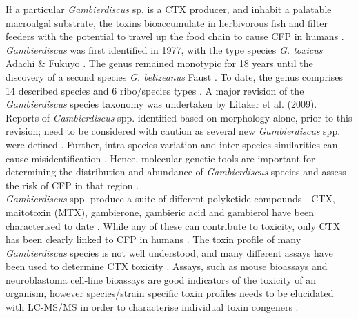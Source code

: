 \documentclass[12pt]{article}
\begin{document}
If a particular \emph{Gambierdiscus} sp. is a CTX producer, and inhabit a palatable macroalgal substrate, the toxins bioaccumulate in herbivorous fish and filter feeders with the potential to travel up the food chain to cause CFP in humans  \citep{chinain1997intraspecific,holmes1998gambierdiscus}. 
\FloatBarrier
\emph{Gambierdiscus} was first identified in 1977, with the type species \emph{G. toxicus} Adachi \& Fukuyo \citep{adachi1979thecal}. 
The genus remained monotypic for 18 years until the discovery of a second species \emph{G. belizeanus} Faust \citep{faust1995observation}. 
To date, the genus comprises 14 described species and 6 ribo/species types
 \citep{smith2016new,fraga2016gambierdiscus,litaker2010global,adachi1979thecal,faust1995observation,chinain1999morphology,litaker2009taxonomy,dai2017taxonomic,nishimura2014morphology,rhodes2017new,kretzschmar2017characterization,fraga2011gambierdiscus,xu2014distribution,fraga2014genus} .
A major revision of the \emph{Gambierdiscus} species taxonomy was undertaken by Litaker et al. (2009). 
Reports of \emph{Gambierdiscus} spp. identified based on morphology alone, prior to this revision; need to be considered with caution as several new \emph{Gambierdiscus} spp. were defined \cite{holmes1990toxicity,holmes1991strain,holmes1994purification}. 
Further, intra-species variation and inter-species similarities can cause misidentification \citep{bravo2014cellular,kretzschmar2017characterization,kohli2014high}. 
Hence, molecular genetic tools are important for determining the distribution and abundance of  \textit{Gambierdiscus} species and assess the risk of CFP in that region \citep{kohli2014high,kretzschmar2017characterization}. \\
\emph{Gambierdiscus} spp. produce a suite of different polyketide compounds - CTX, maitotoxin (MTX), gambierone, gambieric acid and gambierol have been characterised to date \citep{satake1993gambierol,nagai1992gambieric,rodriguez2015gambierone,murata1993structure,murata1989structures}. 
While any of these can contribute to toxicity, only CTX has been clearly linked to CFP in humans \citep{chinain1997intraspecific,holmes1998gambierdiscus}. 
The toxin profile of many \textit{Gambierdiscus} species is not well understood, and many different assays have been used to determine CTX toxicity \citep{globalcig}. 
Assays, such as mouse bioassays and neuroblastoma cell-line bioassays are good indicators of the toxicity of an organism, however species/strain specific toxin profiles needs to be elucidated with LC-MS/MS in order to characterise individual toxin congeners \citep{diogened2014chemistry}. 
\end{document}
